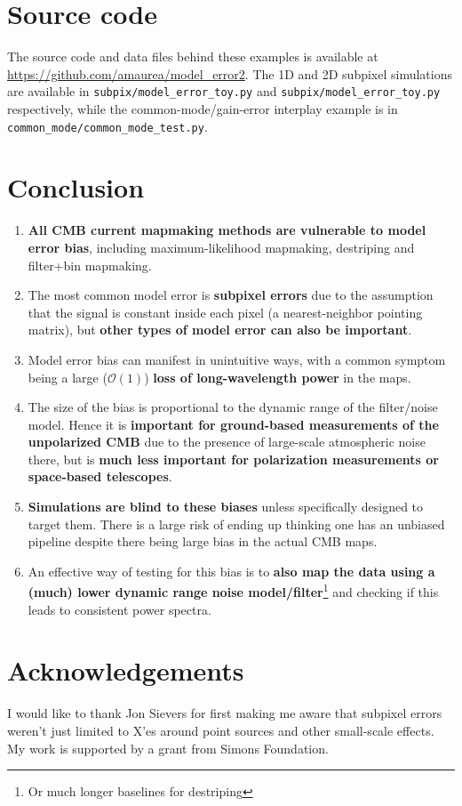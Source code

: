 \documentclass[twocolumn,apj]{aastex63}
\begin{document}
\section{Source code}
\label{sec:code}
The source code and data files behind these examples is available at
\url{https://github.com/amaurea/model_error2}. The 1D and 2D subpixel
simulations are available in \verb|subpix/model_error_toy.py| and \verb|subpix/model_error_toy.py|
respectively, while the common-mode/gain-error interplay example is in
\verb|common_mode/common_mode_test.py|.

\section{Conclusion}

\begin{enumerate}
	\item \textbf{All CMB current mapmaking methods are vulnerable to model error bias},
		including maximum-likelihood mapmaking, destriping and filter+bin mapmaking.
	\item The most common model error is \textbf{subpixel errors} due to the assumption that
		the signal is constant inside each pixel (a nearest-neighbor pointing matrix),
		but \textbf{other types of model error can also be important}.
	\item Model error bias can manifest in unintuitive ways, with a common symptom
		being a large ($\mathcal{O}(1)$) \textbf{loss of long-wavelength power} in the maps.
	\item The size of the bias is proportional to the dynamic range of the filter/noise model.
		Hence it is \textbf{important for ground-based measurements of the unpolarized CMB}
		due to the presence of large-scale atmospheric noise there, but is \textbf{much less
		important for polarization measurements or space-based telescopes}.
	\item \textbf{Simulations are blind to these biases} unless specifically designed to
		target them. There is a large risk of ending up thinking one has an unbiased
		pipeline despite there being large bias in the actual CMB maps.
	\item An effective way of testing for this bias is to \textbf{also map the data using a
		(much) lower dynamic range noise model/filter}\footnote{Or much longer baselines for destriping}
		and checking if this leads to consistent power spectra.
\end{enumerate}

\section*{Acknowledgements}
I would like to thank Jon Sievers for first making me aware
that subpixel errors weren't just limited to X'es around point
sources and other small-scale effects.
My work is supported by a grant from Simons Foundation.



\end{document}
